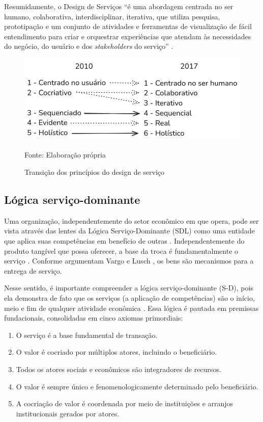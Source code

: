 Resumidamente, o Design de Serviços ``é uma abordagem centrada no ser humano, colaborativa, interdisciplinar, iterativa, que utiliza pesquisa, prototipação e um conjunto de atividades e ferramentas de visualização de fácil entendimento para criar e orquestrar experiências que atendam às necessidades do negócio, do usuário e dos \textit{stakeholders} do serviço'' \cite{Stickdorn2019}.

\begin{figure}[h]
	\centering %
	\includegraphics[width=16cm]{figuras/principios.png} %
	\caption{Transição dos princípios do design de serviço}
	Fonte: Elaboração própria
	\label{figura:qualquernome}
\end{figure}

\subsection{Lógica serviço-dominante}

Uma organização, independentemente do setor econômico em que opera, pode ser vista através das lentes da Lógica Serviço-Dominante (SDL) como uma entidade que aplica suas competências em benefício de outras \cite{VargoLusch2004Evolving}. Independentemente do produto tangível que possa oferecer, a base da troca é fundamentalmente o serviço \cite{VargoLusch2004Evolving}. Conforme argumentam Vargo e Lusch \cite{VargoLusch2004Evolving}, os bens são mecanismos para a entrega de serviço.

Nesse sentido, é importante compreender a lógica serviço-dominante (S-D), pois ela demonstra de fato que os serviços (a aplicação de competências) são o início, meio e fim de qualquer atividade econômica \cite{VargoLusch2004Evolving}. Essa lógica é pautada em premissas fundacionais, consolidadas em cinco axiomas primordiais:

\begin{enumerate}
	\item O serviço é a base fundamental de transação.
	\item O valor é cocriado por múltiplos atores, incluindo o beneficiário.
	\item Todos os atores sociais e econômicos são integradores de recursos.
	\item O valor é sempre único e fenomenologicamente determinado pelo beneficiário.
	\item A cocriação de valor é coordenada por meio de instituições e arranjos institucionais gerados por atores.
\end{enumerate}

